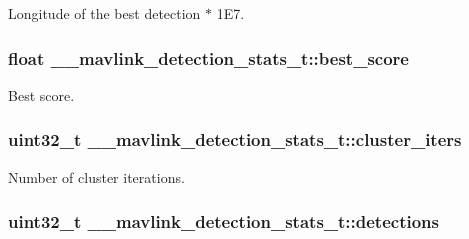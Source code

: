 Longitude of the best detection $\ast$ 1\+E7. 

\hypertarget{struct____mavlink__detection__stats__t_a0e1d8350f41f0548e907188698e9539e}{
\subsubsection[{best\+\_\+score}]{\setlength{\rightskip}{0pt plus 5cm}float \+\_\+\+\_\+mavlink\+\_\+detection\+\_\+stats\+\_\+t\+::best\+\_\+score}}\label{struct____mavlink__detection__stats__t_a0e1d8350f41f0548e907188698e9539e}


Best score. 

\hypertarget{struct____mavlink__detection__stats__t_a0d268ba0aa7aa7f74d1046d20636fc4b}{
\subsubsection[{cluster\+\_\+iters}]{\setlength{\rightskip}{0pt plus 5cm}uint32\+\_\+t \+\_\+\+\_\+mavlink\+\_\+detection\+\_\+stats\+\_\+t\+::cluster\+\_\+iters}}\label{struct____mavlink__detection__stats__t_a0d268ba0aa7aa7f74d1046d20636fc4b}


Number of cluster iterations. 

\hypertarget{struct____mavlink__detection__stats__t_aa84f6983a4c9c9b55ef1556f68eb9ac2}{
\subsubsection[{detections}]{\setlength{\rightskip}{0pt plus 5cm}uint32\+\_\+t \+\_\+\+\_\+mavlink\+\_\+detection\+\_\+stats\+\_\+t\+::detections}}\label{struct____mavlink__detection__stats__t_aa84f6983a4c9c9b55ef1556f68eb9ac2}


